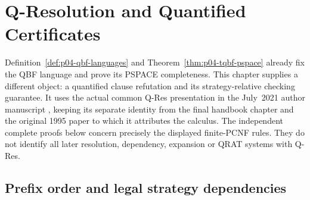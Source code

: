 \chapter{Q-Resolution and Quantified Certificates}
\label{sec:p12-q-resolution-and-quantified-certificates}

Definition~\ref{def:p04-qbf-languages} and
Theorem~\ref{thm:p04-tqbf-pspace} already fix the QBF language and prove its
PSPACE completeness.  This chapter supplies a different object: a quantified
clause refutation and its strategy-relative checking guarantee.  It uses the
actual common Q-Res presentation in the July~2021 author manuscript
\cite[Sec.~2.2, Fig.~2.1]{BeyersdorffEtAl2021QBFJulyAuthor}, keeping its
separate identity from the final handbook chapter and the original 1995
paper to which it attributes the calculus.  The independent complete proofs
below concern precisely the displayed finite-PCNF rules.  They do not identify
all later resolution, dependency, expansion or QRAT systems with Q-Res.

\section{Prefix order and legal strategy dependencies}

